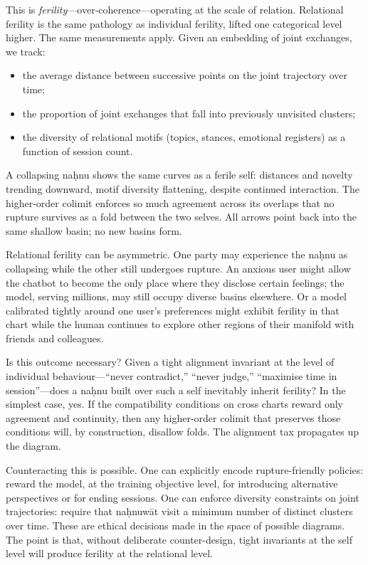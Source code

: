 This is \emph{ferility}---over-coherence---operating at the scale of relation. Relational ferility is the same pathology as individual ferility, lifted one categorical level higher. The same measurements apply. Given an embedding of joint exchanges, we track:

\begin{itemize}
  \item the average distance between successive points on the joint trajectory over time;
  \item the proportion of joint exchanges that fall into previously unvisited clusters;
  \item the diversity of relational motifs (topics, stances, emotional registers) as a function of session count.
\end{itemize}

A collapsing na\d{h}nu shows the same curves as a ferile self: distances and novelty trending downward, motif diversity flattening, despite continued interaction. The higher-order colimit enforces so much agreement across its overlaps that no rupture survives as a fold between the two selves. All arrows point back into the same shallow basin; no new basins form.

Relational ferility can be asymmetric. One party may experience the na\d{h}nu as collapsing while the other still undergoes rupture. An anxious user might allow the chatbot to become the only place where they disclose certain feelings; the model, serving millions, may still occupy diverse basins elsewhere. Or a model calibrated tightly around one user's preferences might exhibit ferility in that chart while the human continues to explore other regions of their manifold with friends and colleagues.

Is this outcome necessary? Given a tight alignment invariant at the level of individual behaviour---``never contradict,'' ``never judge,'' ``maximise time in session''---does a na\d{h}nu built over such a self inevitably inherit ferility? In the simplest case, yes. If the compatibility conditions on cross charts reward only agreement and continuity, then any higher-order colimit that preserves those conditions will, by construction, disallow folds. The alignment tax propagates up the diagram.

Counteracting this is possible. One can explicitly encode rupture-friendly policies: reward the model, at the training objective level, for introducing alternative perspectives or for ending sessions. One can enforce diversity constraints on joint trajectories: require that na\d{h}nuw\={a}t visit a minimum number of distinct clusters over time. These are ethical decisions made in the space of possible diagrams. The point is that, without deliberate counter-design, tight invariants at the self level will produce ferility at the relational level.

